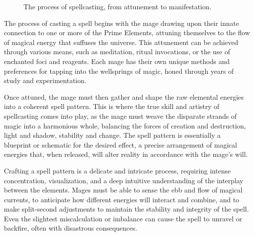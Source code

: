 \documentclass[12pt]{article}
\begin{document}
\begin{figure}[htb]
    \centering
    \caption{The process of spellcasting, from attunement to manifestation.}
    \label{fig:spellcasting_flowchart}
\end{figure}

The process of casting a spell begins with the mage drawing upon their innate connection to one or more of the Prime Elements, attuning themselves to the flow of magical energy that suffuses the universe. This attunement can be achieved through various means, such as meditation, ritual invocations, or the use of enchanted foci and reagents. Each mage has their own unique methods and preferences for tapping into the wellsprings of magic, honed through years of study and experimentation.

Once attuned, the mage must then gather and shape the raw elemental energies into a coherent spell pattern. This is where the true skill and artistry of spellcasting comes into play, as the mage must weave the disparate strands of magic into a harmonious whole, balancing the forces of creation and destruction, light and shadow, stability and change. The spell pattern is essentially a blueprint or schematic for the desired effect, a precise arrangement of magical energies that, when released, will alter reality in accordance with the mage's will.

Crafting a spell pattern is a delicate and intricate process, requiring intense concentration, visualization, and a deep intuitive understanding of the interplay between the elements. Mages must be able to sense the ebb and flow of magical currents, to anticipate how different energies will interact and combine, and to make split-second adjustments to maintain the stability and integrity of the spell. Even the slightest miscalculation or imbalance can cause the spell to unravel or backfire, often with disastrous consequences.
\end{document}
